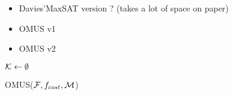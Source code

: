 \begin{itemize}
    \item Davies'MaxSAT version ? (takes a lot of space on paper)
    \item OMUS v1
    \item OMUS v2
\end{itemize}

\begin{algorithm}[ht]
    \DontPrintSemicolon
    $\mathcal{K} \gets \emptyset$  \label{omus-line1} \;
  
    \caption{\textsc{OMUS($\mathcal{F}, f_{cost}, \mathcal{M}$)}}
    \label{alg:omus}
  \end{algorithm}

